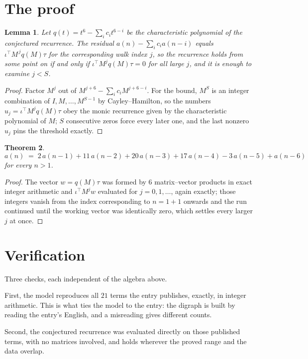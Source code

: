 \documentclass[11pt,a4paper]{article}
\theoremstyle{plain}
\newtheorem{theorem}{Theorem}
\newtheorem{lemma}[theorem]{Lemma}
\theoremstyle{definition}
\begin{document}
\section{The proof}

\begin{lemma}\label{lem:crit}
Let $q(t)=t^{6}-\sum_i c_it^{6-i}$ be the characteristic polynomial of the
conjectured recurrence. The residual $a(n)-\sum_ic_ia(n-i)$ equals
$\iota^{\!\top}M^{\,j}q(M)\tau$ for the corresponding walk index $j$, so the recurrence
holds from some point on if and only if $\iota^{\!\top}M^{j}q(M)\tau=0$ for all large $j$,
and it is enough to examine $j<S$.
\end{lemma}

\begin{proof}
Factor $M^{j}$ out of $M^{j+6}-\sum_ic_iM^{j+6-i}$. For the bound, $M^{S}$
is an integer combination of $I,M,\dots,M^{S-1}$ by Cayley--Hamilton, so the numbers
$u_j=\iota^{\!\top}M^{j}q(M)\tau$ obey the monic recurrence given by the characteristic
polynomial of $M$; $S$ consecutive zeros force every later one, and the last nonzero $u_j$
pins the threshold exactly.
\end{proof}

\begin{theorem}
\[
a(n)\;=\;2\,a(n-1) + 11\,a(n-2) + 20\,a(n-3) + 17\,a(n-4) - 3\,a(n-5) + a(n-6)
\]
for every $n>1$.
\end{theorem}

\begin{proof}
The vector $w=q(M)\tau$ was formed by $6$ matrix--vector products in exact integer
arithmetic and $\iota^{\!\top}M^{j}w$ evaluated for $j=0,1,\dots$, again exactly; those
integers vanish from the index corresponding to $n=1+1$ onwards and the run continued
until the working vector was identically zero, which settles every larger $j$ at once.
\end{proof}

\section{Verification}

Three checks, each independent of the algebra above.

First, the model reproduces all $21$ terms the entry publishes, exactly, in integer
arithmetic. This is what ties the model to the entry: the digraph is built by reading the
entry's English, and a misreading gives different counts.

Second, the conjectured recurrence was evaluated directly on those published terms, with no
matrices involved, and holds wherever the proved range and the data overlap.
\end{document}
